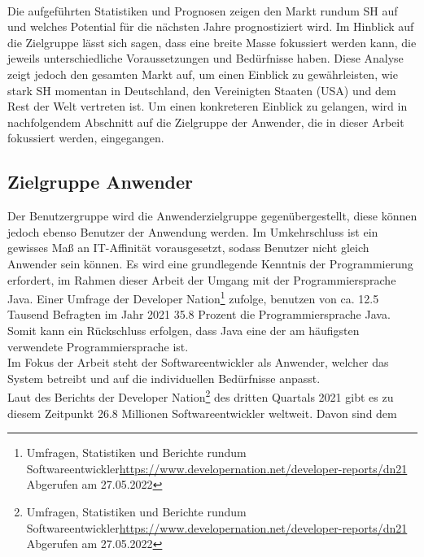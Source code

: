         \\
        Die aufgeführten Statistiken und Prognosen zeigen den Markt rundum \acl{SH} auf und welches Potential für die 
        nächsten Jahre prognostiziert wird. Im Hinblick auf die Zielgruppe lässt sich sagen, dass eine breite Masse 
        fokussiert werden kann, die jeweils unterschiedliche Voraussetzungen und Bedürfnisse haben. Diese Analyse zeigt 
        jedoch den gesamten Markt auf, um einen Einblick zu gewährleisten, wie stark \acl{SH} momentan in Deutschland, den 
        Vereinigten Staaten (USA) und dem Rest der Welt vertreten ist. Um einen konkreteren Einblick 
        zu gelangen, wird in nachfolgendem Abschnitt auf die Zielgruppe der Anwender, die in dieser Arbeit fokussiert werden, 
        eingegangen. 

    \subsection{Zielgruppe Anwender}
        Der Benutzergruppe wird die Anwenderzielgruppe gegenübergestellt, diese können jedoch ebenso Benutzer der Anwendung 
        werden. Im Umkehrschluss ist ein gewisses Maß an \acs{IT}-Affinität vorausgesetzt, sodass Benutzer nicht gleich 
        Anwender sein können. Es wird eine grundlegende Kenntnis der Programmierung erfordert, im Rahmen dieser Arbeit 
        der Umgang mit der Programmiersprache Java. Einer Umfrage der Developer Nation\footnote{Umfragen, Statistiken und Berichte rundum Softwareentwickler\url{https://www.developernation.net/developer-reports/dn21} Abgerufen am 27.05.2022} 
        zufolge, benutzen von ca. 12.5 Tausend Befragten im Jahr 2021 35.8 Prozent die Programmiersprache Java. Somit kann 
        ein Rückschluss erfolgen, dass Java eine der am häufigsten verwendete Programmiersprache ist.
        \\
        \linebreak
        Im Fokus der Arbeit steht der Softwareentwickler als Anwender, welcher das System betreibt und auf die 
        individuellen Bedürfnisse anpasst. 
        \\
        Laut des Berichts der Developer Nation\footnote{Umfragen, Statistiken und Berichte rundum Softwareentwickler\url{https://www.developernation.net/developer-reports/dn21} Abgerufen am 27.05.2022}
        des dritten Quartals 2021 gibt es zu diesem Zeitpunkt 26.8 Millionen Softwareentwickler weltweit. Davon sind dem 
